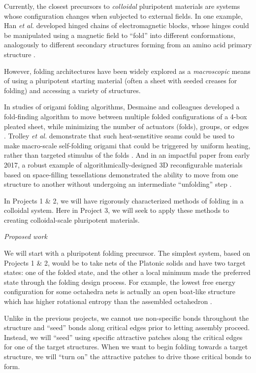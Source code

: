 Currently, the closest precursors to \textit{colloidal} pluripotent materials are systems whose configuration changes when subjected to external fields.
In one example, Han \textit{et al.} developed hinged chains of electromagnetic blocks, whose hinges could be manipulated using a magnetic field to ``fold'' into different conformations, analogously to different secondary structures forming from an amino acid primary structure \cite{Han_2017_SciAdv}.

However, folding architectures have been widely explored as a \textit{macroscopic} means of using a pluripotent starting material (often a sheet with seeded creases for folding) and accessing a variety of structures.

In studies of origami folding algorithms, Desmaine and colleagues developed a fold-finding algorithm to move between multiple folded configurations of a 4-box pleated sheet, while minimizing the number of actuators (folds), groups, or edges \cite{An_2011_Robotica}.
Trolley \textit{et al.} demonstrate that such heat-senstitive seams could be used to make macro-scale self-folding origami that could be triggered by uniform heating, rather than targeted stimulus of the folds \cite{Tolley_2014_SMS}.
And in an impactful paper from early 2017, a robust example of algorithmically-designed 3D reconfigurable materials based on space-filling tessellations demonstrated the ability to move from one structure to another without undergoing an intermediate ``unfolding'' step \cite{Overvelde_2017_Nature}. 

In Projects 1 \& 2, we will have rigorously characterized methods of folding in a colloidal system.
Here in Project 3, we will seek to apply these methods to creating colloidal-scale pluripotent materials.


\textit{Proposed work}

We will start with a pluripotent folding precursor.
The simplest system, based on Projects 1 \& 2, would be to take nets of the Platonic solids and have two target states: one of the folded state, and the other a local minimum made the preferred state through the folding design process.
For example, the lowest free energy configuration for some octahedra nets is actually an open boat-like structure which has higher rotational entropy than the assembled octahedron \cite{Dodd_2018_unpublished}. 

Unlike in the previous projects, we cannot use non-specific bonds throughout the structure and ``seed'' bonds along critical edges prior to letting assembly proceed. 
Instead, we will ``seed'' using specific attractive patches along the critical edges for one of the target structures.
When we want to begin folding towards a target structure, we will ``turn on'' the attractive patches to drive those critical bonds to form.

